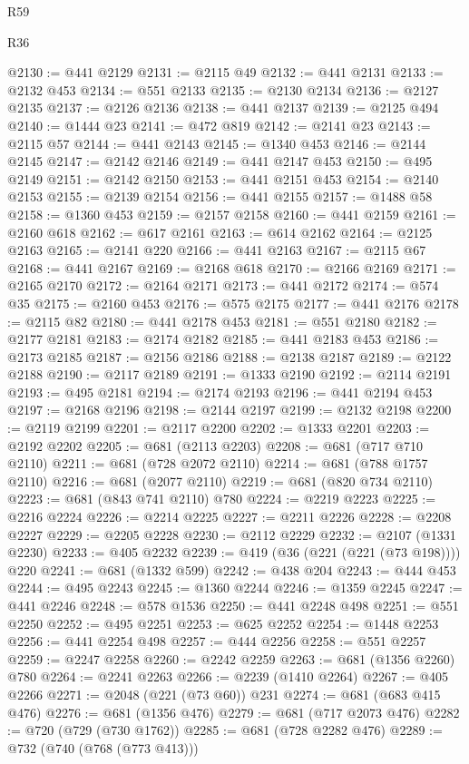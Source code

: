 \begin{lexlean}{R59}
\begin{lexlean}{R36}
\begin{coremodule}
{{{{{{{{{{{{{{{{{{{{{{{{{{{{{{{{{{{{{{{{{{{{{{{{{{{{{{{{{{{{{{{{{{{{{{{{{{{{{{{{{{@2130 := @441 @2129
@2131 := @2115 @49
@2132 := @441 @2131
@2133 := @2132 @453
@2134 := @551 @2133
@2135 := @2130 @2134
@2136 := @2127 @2135
@2137 := @2126 @2136
@2138 := @441 @2137
@2139 := @2125 @494
@2140 := @1444 @23
@2141 := @472 @819
@2142 := @2141 @23
@2143 := @2115 @57
@2144 := @441 @2143
@2145 := @1340 @453
@2146 := @2144 @2145
@2147 := @2142 @2146
@2149 := @441 @2147 @453
@2150 := @495 @2149
@2151 := @2142 @2150
@2153 := @441 @2151 @453
@2154 := @2140 @2153
@2155 := @2139 @2154
@2156 := @441 @2155
@2157 := @1488 @58
@2158 := @1360 @453
@2159 := @2157 @2158
@2160 := @441 @2159
@2161 := @2160 @618
@2162 := @617 @2161
@2163 := @614 @2162
@2164 := @2125 @2163
@2165 := @2141 @220
@2166 := @441 @2163
@2167 := @2115 @67
@2168 := @441 @2167
@2169 := @2168 @618
@2170 := @2166 @2169
@2171 := @2165 @2170
@2172 := @2164 @2171
@2173 := @441 @2172
@2174 := @574 @35
@2175 := @2160 @453
@2176 := @575 @2175
@2177 := @441 @2176
@2178 := @2115 @82
@2180 := @441 @2178 @453
@2181 := @551 @2180
@2182 := @2177 @2181
@2183 := @2174 @2182
@2185 := @441 @2183 @453
@2186 := @2173 @2185
@2187 := @2156 @2186
@2188 := @2138 @2187
@2189 := @2122 @2188
@2190 := @2117 @2189
@2191 := @1333 @2190
@2192 := @2114 @2191
@2193 := @495 @2181
@2194 := @2174 @2193
@2196 := @441 @2194 @453
@2197 := @2168 @2196
@2198 := @2144 @2197
@2199 := @2132 @2198
@2200 := @2119 @2199
@2201 := @2117 @2200
@2202 := @1333 @2201
@2203 := @2192 @2202
@2205 := @681 (@2113 @2203)
@2208 := @681 (@717 @710 @2110)
@2211 := @681 (@728 @2072 @2110)
@2214 := @681 (@788 @1757 @2110)
@2216 := @681 (@2077 @2110)
@2219 := @681 (@820 @734 @2110)
@2223 := @681 (@843 @741 @2110) @780
@2224 := @2219 @2223
@2225 := @2216 @2224
@2226 := @2214 @2225
@2227 := @2211 @2226
@2228 := @2208 @2227
@2229 := @2205 @2228
@2230 := @2112 @2229
@2232 := @2107 (@1331 @2230)
@2233 := @405 @2232
@2239 := @419 (@36 (@221 (@221 (@73 @198)))) @220
@2241 := @681 (@1332 @599)
@2242 := @438 @204
@2243 := @444 @453
@2244 := @495 @2243
@2245 := @1360 @2244
@2246 := @1359 @2245
@2247 := @441 @2246
@2248 := @578 @1536
@2250 := @441 @2248 @498
@2251 := @551 @2250
@2252 := @495 @2251
@2253 := @625 @2252
@2254 := @1448 @2253
@2256 := @441 @2254 @498
@2257 := @444 @2256
@2258 := @551 @2257
@2259 := @2247 @2258
@2260 := @2242 @2259
@2263 := @681 (@1356 @2260) @780
@2264 := @2241 @2263
@2266 := @2239 (@1410 @2264)
@2267 := @405 @2266
@2271 := @2048 (@221 (@73 @60)) @231
@2274 := @681 (@683 @415 @476)
@2276 := @681 (@1356 @476)
@2279 := @681 (@717 @2073 @476)
@2282 := @720 (@729 (@730 @1762))
@2285 := @681 (@728 @2282 @476)
@2289 := @732 (@740 (@768 (@773 @413)))
}}}}}}}}}}}}}}}}}}}}}}}}}}}}}}}}}}}}}}}}}}}}}}}}}}}}}}}}}}}}}}}}}}}}}}}}}}}}}}}}}}
\end{coremodule}
\end{lexlean}
\end{lexlean}
